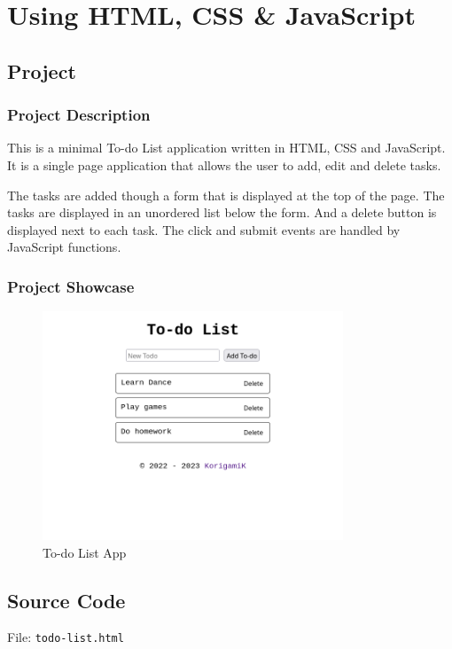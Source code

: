 \section{Using HTML, CSS \& JavaScript}\label{sec:todo}

\subsection{Project}

\subsubsection*{Project Description}

This is a minimal To-do List application written in HTML, CSS and JavaScript. It is a single page application that allows the user to add, edit and delete tasks.

The tasks are added though a form that is displayed at the top of the page.
The tasks are displayed in an unordered list below the form. And a delete button is displayed next to each task.
The click and submit events are handled by JavaScript functions.

\subsubsection*{Project Showcase}

\begin{figure}[H]
    \centering
    \includegraphics[width=0.8\textwidth]{res/todo-list.png}
    \caption{To-do List App}
    \label{fig:todo-list}
\end{figure}


\subsection{Source Code}

File: \texttt{todo-list.html}
